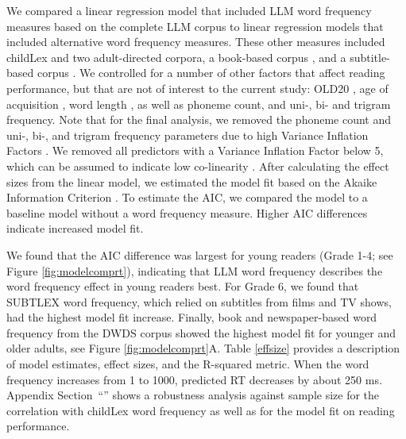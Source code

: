 \documentclass[doc, a4paper, anonymous]{apa7}
\begin{document}
We compared a linear regression model that included LLM word frequency measures based on the complete LLM corpus to linear regression models that included alternative word frequency measures. These other measures included childLex and two adult-directed corpora, a book-based corpus \citep[DWDS][]{heister_dlexdb_2011}, and a subtitle-based corpus \citep[SUBTLEX][]{brysbaert_word_2011}. We controlled for a number of other factors that affect reading performance, but that are not of interest to the current study: OLD20 \citep[e.g., ][]{yarkoni_moving_2008,hawelka_beyond_2013}, age of acquisition \citep[e.g., ][]{weekes_effects_2006}, word length \citep[e.g., ][]{gagl_sources_2015, huestegge_oculomotor_2009, marinus_variability_2010, zoccolotti_word_2005}, as well as phoneme count, and uni-, bi- and trigram frequency. Note that for the final analysis, we removed the phoneme count and uni-, bi-, and trigram frequency parameters due to high Variance Inflation Factors \citep{fox_generalized_1992}. We removed all predictors with a Variance Inflation Factor below 5, which can be assumed to indicate low co-linearity \citep[see][for a similar procedure]{gregorova_access_2023}. After calculating the effect sizes from the linear model, we estimated the model fit based on the Akaike Information Criterion \citep[AIC, ][]{akaike_new_1974}. To estimate the AIC, we compared the model to a baseline model without a word frequency measure. Higher AIC differences indicate increased model fit.

We found that the AIC difference was largest for young readers (Grade 1-4; see Figure \ref{fig:modelcomprt}), indicating that LLM word frequency describes the word frequency effect in young readers best. For Grade 6, we found that SUBTLEX word frequency, which relied on subtitles from films and TV shows, had the highest model fit increase. Finally, book and newspaper-based word frequency from the DWDS corpus showed the highest model fit for younger and older adults, see Figure \ref{fig:modelcomprt}A. Table \ref{effsize} provides a description of model estimates, effect sizes, and the R-squared metric. When the word frequency increases from 1 to 1000, predicted RT decreases by about 250 ms. Appendix Section~“” shows a robustness analysis against sample size for the correlation with childLex word frequency as well as for the model fit on reading performance. 
\end{document}
